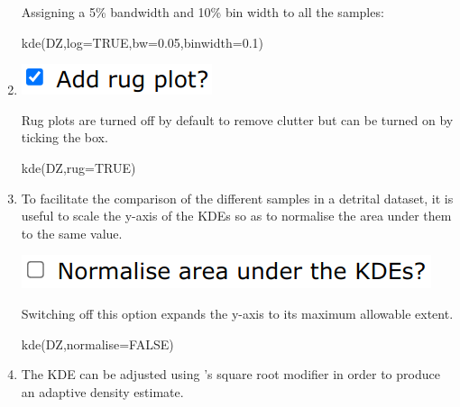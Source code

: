 \begin{refsection}
\begin{enumerate}
Assigning a 5\% bandwidth and 10\% bin width to all the samples:

\begin{console}
kde(DZ,log=TRUE,bw=0.05,binwidth=0.1)
\end{console}

\item\noindent\begin{minipage}[t]{.18\linewidth}
\strut\vspace*{-\baselineskip}\newline
\includegraphics[width=\linewidth]{../figures/detritalrug.png}
\end{minipage}
\begin{minipage}[t]{.82\linewidth}
  Rug plots are turned off by default to remove clutter but can be
  turned on by ticking the box.
\end{minipage}

\begin{console}
kde(DZ,rug=TRUE)
\end{console}

\item To facilitate the comparison of the different samples in a
  detrital dataset, it is useful to scale the y-axis of the KDEs so as
  to normalise the area under them to the same value.

\noindent\begin{minipage}[t]{.38\linewidth}
\strut\vspace*{-\baselineskip}\newline
\includegraphics[width=\linewidth]{../figures/detritalKDEnormalise.png}
\end{minipage}
\begin{minipage}[t]{.62\linewidth}
Switching off this option expands the y-axis to its maximum allowable
extent.
\end{minipage}

\begin{console}
kde(DZ,normalise=FALSE)
\end{console}

\item The KDE can be adjusted using \citet{abramson1982}'s square root
  modifier in order to produce an adaptive density estimate.


\end{enumerate}
\end{refsection}
